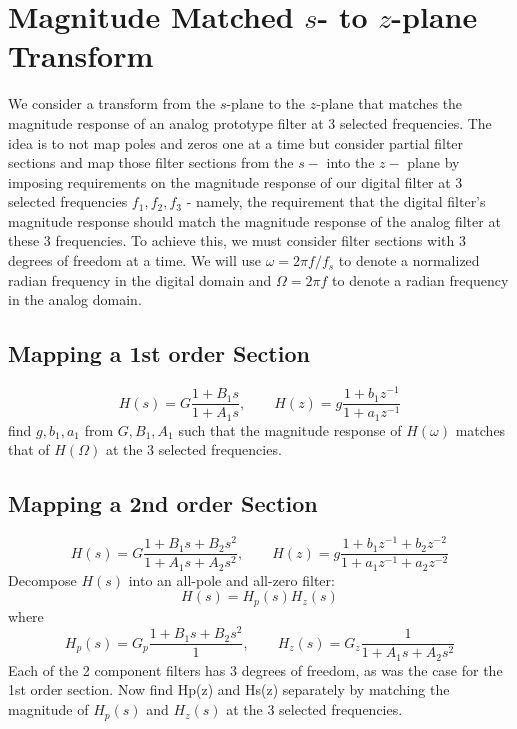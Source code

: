 \section{Magnitude Matched $s$- to $z$-plane Transform}

We consider a transform from the $s$-plane to the $z$-plane that matches the magnitude response of an analog prototype filter at 3 selected frequencies. The idea is to not map poles and zeros one at a time but consider partial filter sections and map those filter sections from the $s-$ into the $z-$ plane by imposing requirements on the magnitude response of our digital filter at 3 selected frequencies $f_1, f_2, f_3$ - namely, the requirement that the digital filter's magnitude response should match the magnitude response of the analog filter at these 3 frequencies. To achieve this, we must consider filter sections with 3 degrees of freedom at a time. We will use $\omega = 2 \pi f/f_s$ to denote a normalized radian frequency in the digital domain and $\Omega = 2 \pi f$ to denote a radian frequency in the analog domain.

\subsection{Mapping a 1st order Section}
\begin{equation}
H(s) = G \frac{1 + B_1 s     }{1 + A_1 s     }, \qquad
H(z) = g \frac{1 + b_1 z^{-1}}{1 + a_1 z^{-1}}
\end{equation}
find $g, b_1, a_1$ from $G, B_1, A_1$ such that the magnitude response of $H(\omega)$ matches that of $H(\Omega)$ at the 3 selected frequencies.


\subsection{Mapping a 2nd order Section}
\begin{equation}
H(s) = G \frac{1 + B_1 s      + B_2 s^2   }{1 + A_1 s      + A_2 s^2   }, \qquad
H(z) = g \frac{1 + b_1 z^{-1} + b_2 z^{-2}}{1 + a_1 z^{-1} + a_2 z^{-2}}
\end{equation}
Decompose $H(s)$ into an all-pole and all-zero filter:
\begin{equation}
H(s) = H_p(s) H_z(s)
\end{equation}
where
\begin{equation}      
H_p(s) = G_p \frac{1 + B_1 s + B_2 s^2}{1}, \qquad
H_z(s) = G_z \frac{1}{1 + A_1 s + A_2 s^2}
\end{equation}
Each of the 2 component filters has 3 degrees of freedom, as was the case for the 1st order section. Now find Hp(z) and Hs(z) separately by matching the magnitude of $H_p(s)$ and $H_z(s)$ at the 3 selected frequencies.

